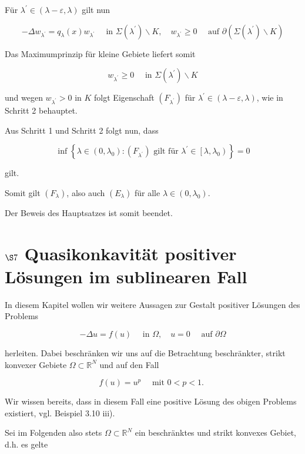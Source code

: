 \documentclass[10pt, letterpaper]{article}
\begin{document}
Für $\lambda^{\prime} \in(\lambda-\varepsilon, \lambda)$ gilt nun

$$
-\Delta w_{\lambda^{\prime}}=q_{\lambda}(x) w_{\lambda^{\prime}} \quad \text { in } \Sigma\left(\lambda^{\prime}\right) \backslash K, \quad w_{\lambda^{\prime}} \geq 0 \quad \text { auf } \partial\left(\Sigma\left(\lambda^{\prime}\right) \backslash K\right)
$$

Das Maximumprinzip für kleine Gebiete liefert somit

$$
w_{\lambda^{\prime}} \geq 0 \quad \text { in } \Sigma\left(\lambda^{\prime}\right) \backslash K
$$

und wegen $w_{\lambda^{\prime}}>0$ in $K$ folgt Eigenschaft $\left(F_{\lambda^{\prime}}\right)$ für $\lambda^{\prime} \in(\lambda-\varepsilon, \lambda)$, wie in Schritt 2 behauptet.

Aus Schritt 1 und Schritt 2 folgt nun, dass

$$
\inf \left\{\lambda \in\left(0, \lambda_{0}\right):\left(F_{\lambda^{\prime}}\right) \text { gilt für } \lambda^{\prime} \in\left[\lambda, \lambda_{0}\right)\right\}=0
$$

gilt.

Somit gilt $\left(F_{\lambda}\right)$, also auch $\left(E_{\lambda}\right)$ für alle $\lambda \in\left(0, \lambda_{0}\right)$.

Der Beweis des Hauptsatzes ist somit beendet.

\section*{$\S 7$ Quasikonkavität positiver Lösungen im sublinearen Fall}

In diesem Kapitel wollen wir weitere Aussagen zur Gestalt positiver Lösungen des Problems

$$
-\Delta u=f(u) \quad \text { in } \Omega, \quad u=0 \quad \text { auf } \partial \Omega
$$

herleiten. Dabei beschränken wir uns auf die Betrachtung beschränkter, strikt konvexer Gebiete $\Omega \subset \mathbb{R}^{N}$ und auf den Fall

$$
f(u)=u^{p} \quad \text { mit } 0<p<1 \text {. }
$$

Wir wissen bereits, dass in diesem Fall eine positive Lösung des obigen Problems existiert, vgl. Beispiel 3.10 iii).

Sei im Folgenden also stets $\Omega \subset \mathbb{R}^{N}$ ein beschränktes und strikt konvexes Gebiet, d.h. es gelte
\end{document}
